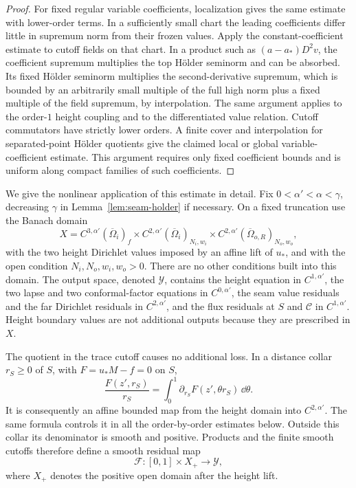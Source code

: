 \begin{proof}
For fixed regular variable coefficients, localization gives the same
estimate with lower-order terms.  In a sufficiently small chart
the leading coefficients differ little in supremum norm from their
frozen values.  Apply the constant-coefficient estimate to cutoff
fields on that chart.  In a product such as
$(a-a_*)D^2v$, the coefficient supremum multiplies the top H\"older
seminorm and can be absorbed.  Its fixed H\"older seminorm multiplies
the second-derivative supremum, which is bounded by an arbitrarily
small multiple of the full high norm plus a fixed multiple of the
field supremum, by interpolation.  The same argument applies to
the order-$1$ height coupling and to the differentiated value
relation.  Cutoff commutators have strictly lower orders.  A finite
cover and interpolation for separated-point H\"older quotients give
the claimed local or global variable-coefficient estimate.  This
argument requires only fixed coefficient bounds and is uniform
along compact families of such coefficients.
\end{proof}

We give the nonlinear application of this estimate in detail.  Fix
$0<\alpha'<\alpha<\gamma$, decreasing $\gamma$ in
Lemma~\ref{lem:seam-holder} if necessary.  On a fixed truncation use
the Banach domain
\begin{equation}
 X=C^{3,\alpha'}(\overline\Omega_i)_f
   \times C^{2,\alpha'}(\overline\Omega_i)_{N_i,w_i}
   \times C^{2,\alpha'}(\overline\Omega_{o,R})_{N_o,w_o},
 \label{eq:transmission-domain-space}
\end{equation}
with the two height Dirichlet values imposed by an affine lift of
$u_*$, and with the open condition $N_i,N_o,w_i,w_o>0$.
There are no other conditions built into this domain.  The output
space, denoted $\mathscr Y$, contains the height equation in
$C^{1,\alpha'}$, the two lapse and two conformal-factor equations
in $C^{0,\alpha'}$, the seam value residuals and the far Dirichlet
residuals in $C^{2,\alpha'}$, and the flux residuals at $S$ and
$\mathcal C$ in $C^{1,\alpha'}$.  Height boundary values are not
additional outputs because they are prescribed in $X$.

The quotient in the trace cutoff causes no additional loss.  In a
distance collar $r_S\geq0$ of $S$, with $F=u_*M-f=0$ on $S$,
\begin{equation}
 \frac{F(z',r_S)}{r_S}
   =\int_0^1\partial_{r_S}F(z',\theta r_S)\,\dd\theta.
 \label{eq:transmission-quotient}
\end{equation}
It is consequently an affine bounded map from the height domain
into $C^{2,\alpha'}$.  The same formula controls it in all the
order-by-order estimates below.  Outside this collar its denominator
is smooth and positive.  Products and the finite smooth cutoffs
therefore define a smooth residual map
\begin{equation}
 \mathscr F:[0,1]\times X_+\longrightarrow\mathscr Y,
 \label{eq:transmission-nonlinear-map}
\end{equation}
where $X_+$ denotes the positive open domain after the height lift.

